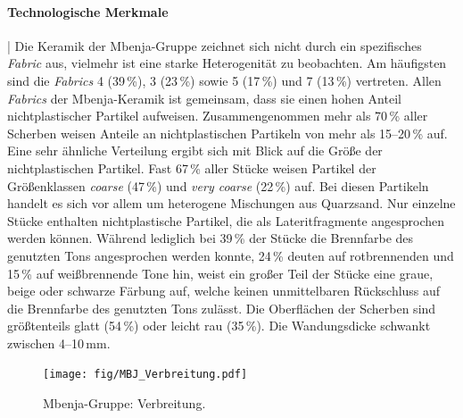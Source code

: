 \paragraph{Technologische Merkmale}\hspace{-.5em}|\hspace{.5em}%
Die Keramik der Mbenja-Gruppe zeichnet sich nicht durch ein spezifisches \textit{Fabric} aus, vielmehr ist eine starke Heterogenität zu beobachten. Am häufigsten sind die \textit{Fabrics} 4 (39\,\%), 3 (23\,\%) sowie 5 (17\,\%) und 7 (13\,\%) vertreten. Allen \textit{Fabrics} der Mbenja-Keramik ist gemeinsam, dass sie einen hohen Anteil nichtplastischer Partikel aufweisen. Zusammengenommen mehr als 70\,\% aller Scherben weisen Anteile an nichtplastischen Partikeln von mehr als 15--20\,\% auf. Eine sehr ähnliche Verteilung ergibt sich mit Blick auf die Größe der nichtplastischen Partikel. Fast 67\,\% aller Stücke weisen Partikel der Größenklassen \textit{coarse} (47\,\%) und \textit{very coarse} (22\,\%) auf. Bei diesen Partikeln handelt es sich vor allem um heterogene Mischungen aus Quarzsand. Nur einzelne Stücke enthalten nichtplastische Partikel, die als Lateritfragmente angesprochen werden können. Während lediglich bei 39\,\% der Stücke die Brennfarbe des genutzten Tons angesprochen werden konnte, 24\,\% deuten auf rotbrennenden und 15\,\% auf weißbrennende Tone hin, weist ein großer Teil der Stücke eine graue, beige oder schwarze Färbung auf, welche keinen unmittelbaren Rückschluss auf die Brennfarbe des genutzten Tons zulässt. Die Oberflächen der Scherben sind größtenteils glatt (54\,\%) oder leicht rau (35\,\%). Die Wandungsdicke schwankt zwischen \mbox{4--10\,mm}.

\begin{figure}[p]
	\centering
	\texttt{[image: fig/MBJ\_Verbreitung.pdf]}
	\caption{Mbenja-Gruppe: Verbreitung.}
	\label{fig:MBJ_Verbreitung}
\end{figure}


